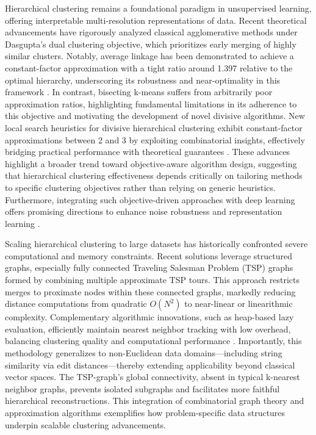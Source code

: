 \documentclass[sigconf]{acmart}
\begin{document}
Hierarchical clustering remains a foundational paradigm in unsupervised learning, offering interpretable multi-resolution representations of data. Recent theoretical advancements have rigorously analyzed classical agglomerative methods under Dasgupta’s dual clustering objective, which prioritizes early merging of highly similar clusters. Notably, average linkage has been demonstrated to achieve a constant-factor approximation with a tight ratio around 1.397 relative to the optimal hierarchy, underscoring its robustness and near-optimality in this framework \cite{ref12}. In contrast, bisecting k-means suffers from arbitrarily poor approximation ratios, highlighting fundamental limitations in its adherence to this objective and motivating the development of novel divisive algorithms. New local search heuristics for divisive hierarchical clustering exhibit constant-factor approximations between 2 and 3 by exploiting combinatorial insights, effectively bridging practical performance with theoretical guarantees \cite{ref12}. These advances highlight a broader trend toward objective-aware algorithm design, suggesting that hierarchical clustering effectiveness depends critically on tailoring methods to specific clustering objectives rather than relying on generic heuristics. Furthermore, integrating such objective-driven approaches with deep learning offers promising directions to enhance noise robustness and representation learning \cite{ref12}.

Scaling hierarchical clustering to large datasets has historically confronted severe computational and memory constraints. Recent solutions leverage structured graphs, especially fully connected Traveling Salesman Problem (TSP) graphs formed by combining multiple approximate TSP tours. This approach restricts merges to proximate nodes within these connected graphs, markedly reducing distance computations from quadratic \(O(N^2)\) to near-linear or linearithmic complexity. Complementary algorithmic innovations, such as heap-based lazy evaluation, efficiently maintain nearest neighbor tracking with low overhead, balancing clustering quality and computational performance \cite{ref21}. Importantly, this methodology generalizes to non-Euclidean data domains—including string similarity via edit distances—thereby extending applicability beyond classical vector spaces. The TSP-graph’s global connectivity, absent in typical k-nearest neighbor graphs, prevents isolated subgraphs and facilitates more faithful hierarchical reconstructions. This integration of combinatorial graph theory and approximation algorithms exemplifies how problem-specific data structures underpin scalable clustering advancements.
\end{document}
